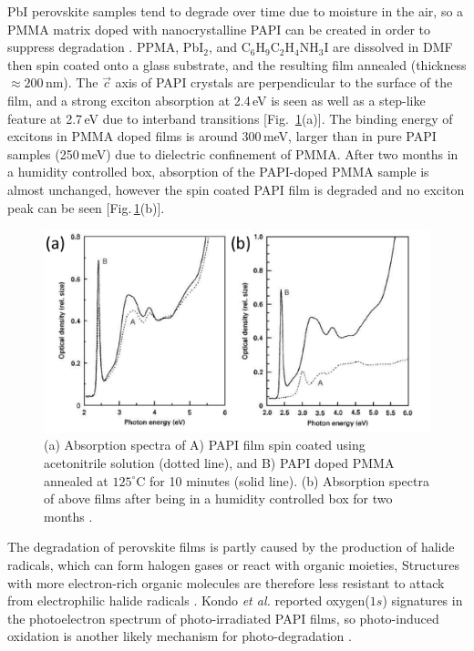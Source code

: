 PbI perovskite samples tend to degrade over time due to moisture in the air, so a PMMA matrix doped with nanocrystalline PAPI can be created in order to suppress degradation \cite{Kitazawa1998}. PPMA, Pb$\textrm{I}_2$, and $\textrm{C}_6\textrm{H}_9\textrm{C}_2\textrm{H}_4\textrm{NH}_3\textrm{I}$ are dissolved in DMF then spin coated onto a glass substrate, and the resulting film annealed (thickness $\approx200$\,nm). The $\vec{c}$ axis of PAPI crystals are perpendicular to the surface of the film, and a strong exciton absorption at 2.4\,eV is seen as well as a step-like feature at 2.7\,eV due to interband transitions [Fig.\ \ref{2Fig10}(a)]. The binding energy of excitons in PMMA doped films is around 300\,meV, larger than in pure PAPI samples (250\,meV) due to dielectric confinement of PMMA. After two months in a humidity controlled box, absorption of the PAPI-doped PMMA sample is almost unchanged, however the spin coated PAPI film is degraded and no exciton peak can be seen [Fig.\,\ref{2Fig10}(b)].
\begin{figure}
\centering
\includegraphics[width=\textwidth]{Fig10}
\caption{ (a) Absorption spectra of A) PAPI film spin coated using acetonitrile solution (dotted line), and B) PAPI doped PMMA annealed at $125^{\circ}$C for 10 minutes (solid line). (b) Absorption spectra of above films after being in a humidity controlled box for two months \cite{Kitazawa1998}.}
\label{2Fig10}
\end{figure}

The degradation of perovskite films is partly caused by the production of halide radicals, which can form halogen gases or react with organic moieties, Structures with more electron-rich organic molecules are therefore less resistant to attack from electrophilic halide radicals \cite{Wei2014}. Kondo \textit{et al.} reported oxygen($1s$) signatures in the photoelectron spectrum of photo-irradiated PAPI films, so photo-induced oxidation is another likely mechanism for photo-degradation \cite{Kitazawa2002}.


